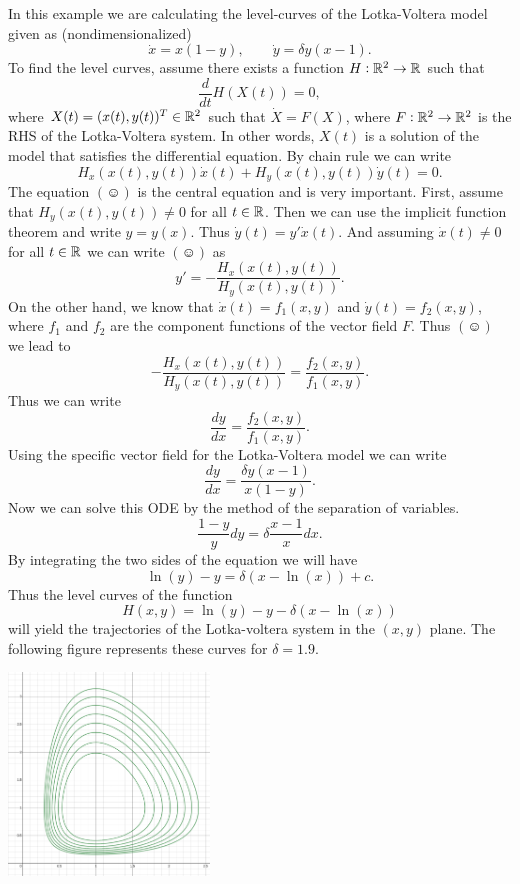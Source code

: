 \begin{example}
	In this example we are calculating the level-curves of the Lotka-Voltera model given as (nondimensionalized)
	\[ \dot{x} = x(1-y), \qquad \dot{y} = \delta y (x-1). \]
	To find the level curves, assume there exists a function $H:\mathbb{R}^2 \to \mathbb{R}$ such that 
	\[ \frac{d}{dt} H(X(t))=0, \]
	where $X(t) = (x(t),y(t))^T \in \mathbb{R}^2$ such that $\dot{X} = F(X)$, where $F:\mathbb{R}^2 \to \mathbb{R}^2$ is the RHS of the Lotka-Voltera system. In other words, $X(t)$ is a solution of the model that satisfies the differential equation. By chain rule we can write
	\[ H_x(x(t), y(t)) \dot{x}(t) + H_y(x(t),y(t)) \dot{y}(t) = 0. \tag{\smiley}  \]
	The equation $(\smiley)$ is the central equation and is very important. First, assume that $H_y(x(t),y(t)) \neq 0$ for all $t\in \mathbb{R}$. Then we can use the implicit function theorem and write $y = y(x)$. Thus $\dot{y}(t) = y' \dot{x}(t)$. And assuming $\dot{x}(t) \neq 0$ for all $t\in \mathbb{R}$ we can write $(\smiley)$ as 
	\[ y' = -\frac{ H_x(x(t), y(t))}{ H_y(x(t), y(t))}. \]
	On the other hand, we know that $\dot{x}(t) = f_1(x,y)$ and $\dot{y}(t) = f_2(x,y)$, where $f_1$ and $f_2$ are the component functions of the vector field $F$. Thus $(\smiley)$ we lead to 
	\[ -\frac{ H_x(x(t), y(t))}{ H_y(x(t), y(t))} = \frac{f_2(x,y)}{f_1(x,y)}.  \]
	Thus we can write
	\[ \frac{dy}{dx} = \frac{f_2(x,y)}{f_1(x,y)}. \]
	Using the specific vector field for the Lotka-Voltera model we can write
	\[ \frac{dy}{dx} = \frac{\delta y(x-1)}{x(1-y)}. \]
	Now we can solve this ODE by the method of the separation of variables.
	\[ \frac{1-y}{y} dy = \delta \frac{x-1}{x} dx. \]
	By integrating the two sides of the equation we will have
	\[ \ln(y) - y = \delta (x - \ln(x)) + c. \]
	Thus the level curves of the function 
	\[ H(x,y) = \ln(y) - y - \delta (x - \ln(x))  \]
	will yield the trajectories of the Lotka-voltera system in the $(x,y)$ plane. The following figure represents these curves for $\delta = 1.9$.
	\begin{center}
		\includegraphics[width=0.4\textwidth]{Images/LotkaVolterraLevelCurves.png}
	\end{center}

\end{example}

